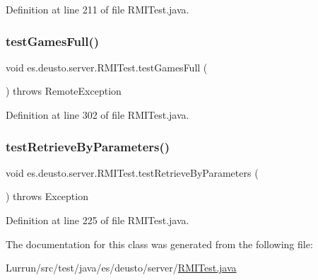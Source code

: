 Definition at line 211 of file R\+M\+I\+Test.\+java.

\mbox{\label{classes_1_1deusto_1_1server_1_1_r_m_i_test_a36131d385518bf235184ccf288d6e126}} 
\subsubsection{\texorpdfstring{test\+Games\+Full()}{testGamesFull()}}
{\footnotesize\ttfamily void es.\+deusto.\+server.\+R\+M\+I\+Test.\+test\+Games\+Full (\begin{DoxyParamCaption}{ }\end{DoxyParamCaption}) throws Remote\+Exception}



Definition at line 302 of file R\+M\+I\+Test.\+java.

\mbox{\label{classes_1_1deusto_1_1server_1_1_r_m_i_test_ad003df1db33c457541376488626208cc}} 
\subsubsection{\texorpdfstring{test\+Retrieve\+By\+Parameters()}{testRetrieveByParameters()}}
{\footnotesize\ttfamily void es.\+deusto.\+server.\+R\+M\+I\+Test.\+test\+Retrieve\+By\+Parameters (\begin{DoxyParamCaption}{ }\end{DoxyParamCaption}) throws Exception}



Definition at line 225 of file R\+M\+I\+Test.\+java.



The documentation for this class was generated from the following file\+:\begin{DoxyCompactItemize}
\item 
Lurrun/src/test/java/es/deusto/server/\hyperlink{_r_m_i_test_8java}{R\+M\+I\+Test.\+java}\end{DoxyCompactItemize}
